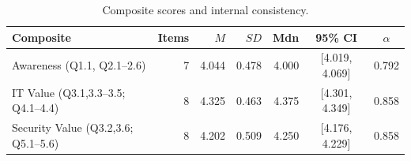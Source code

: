 \begin{table}[ht]
\centering
\caption{Composite scores and internal consistency.}
\label{tab:comp}
\small
\begin{tabular}{lrrrrcc}
\toprule
Composite & Items & $M$ & $SD$ & Mdn & 95\% CI & $\alpha$ \\
\midrule
Awareness (Q1.1, Q2.1--2.6) & 7 & 4.044 & 0.478 & 4.000 & [4.019, 4.069] & 0.792 \\
IT Value (Q3.1,3.3--3.5; Q4.1--4.4) & 8 & 4.325 & 0.463 & 4.375 & [4.301, 4.349] & 0.858 \\
Security Value (Q3.2,3.6; Q5.1--5.6) & 8 & 4.202 & 0.509 & 4.250 & [4.176, 4.229] & 0.858 \\
\bottomrule
\end{tabular}
\end{table}
